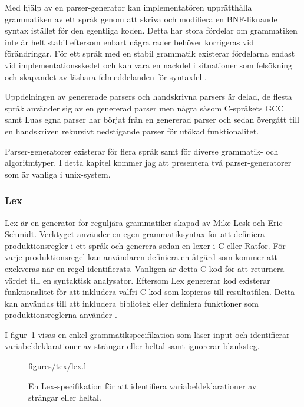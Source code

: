 Med hjälp av en parser-generator kan implementatören upprätthålla grammatiken
av ett språk genom att skriva och modifiera en BNF-liknande syntax istället
för den egentliga koden. Detta har stora fördelar om grammatiken inte är helt
stabil eftersom enbart några rader behöver korrigeras vid förändringar. För
ett språk med en stabil grammatik existerar fördelarna endast vid
implementationsskedet och kan vara en nackdel i situationer som felsökning och
skapandet av läsbara felmeddelanden för syntaxfel \citep[s. 175]{bf09}.

Uppdelningen av genererade parsers och handskrivna parsers är delad, de flesta
språk använder sig av en genererad parser men några såsom C-språkets GCC \citep{gcc}
samt Luas egna parser \citep{luaimp} har börjat från en genererad parser och
sedan övergått till en handskriven rekursivt nedstigande parser för utökad
funktionalitet.

Parser-generatorer existerar för flera språk samt för diverse grammatik- och
algoritmtyper. I detta kapitel kommer jag att presentera två
parser-generatorer som är vanliga i unix-system.

\subsubsection{Lex}

Lex är en generator för reguljära grammatiker skapad av Mike Lesk och
Eric Schmidt. Verktyget använder en egen grammatiksyntax för att
definiera produktionsregler i ett språk och generera sedan en lexer i C eller
Ratfor. För varje produktionsregel kan användaren definiera en åtgärd som
kommer att exekveras när en regel identifierats. Vanligen är detta C-kod för
att returnera värdet till en syntaktisk analysator. Eftersom Lex genererar kod
existerar funktionalitet för att inkludera valfri C-kod som kopieras till
resultatfilen. Detta kan användas till att inkludera bibliotek eller
definiera funktioner som produktionsreglerna använder \citep{lex}.

I figur~\ref{fig:lex} visas en enkel grammatikspecifikation som läser input
och identifierar variabeldeklarationer av strängar eller heltal samt ignorerar
blanksteg.

\begin{figure}[ht]
    {figures/tex/lex.l}
  \caption{En Lex-specifikation för att identifiera variabeldeklarationer av
    strängar eller heltal.}
  \label{fig:lex}
\end{figure}

